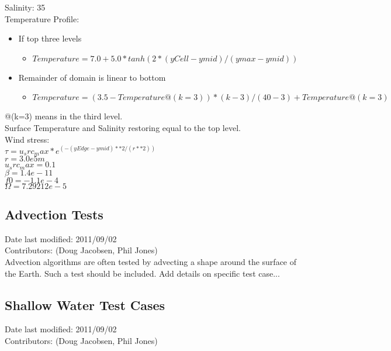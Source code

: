 \documentclass[11pt]{report}
\begin{document}
\noindent Salinity: 35 \\
\noindent Temperature Profile: 
\begin{itemize}
	\item If top three levels
		\begin{itemize}
			\item $Temperature = 7.0 + 5.0*tanh(2*(yCell - ymid) / (ymax-ymid))$
		\end{itemize}
	\item Remainder of domain is linear to bottom
		\begin{itemize}
			\item $Temperature = (3.5-Temperature@(k=3))*(k-3)/(40-3) + Temperature@(k=3)$
		\end{itemize}
\end{itemize}

\noindent @(k=3) means in the third level. \\

\noindent Surface Temperature and Salinity restoring equal to the top level. \\

\noindent Wind stress: \\
\noindent $\tau = u_src_max * e^(-(yEdge - ymid)**2/(r**2))$ \\
\noindent $r = 3.0e5m$ \\
\noindent $u_src_max = 0.1$ \\

\noindent $\beta = 1.4e-11$ \\
\noindent $f0 = -1.1e-4$ \\
\noindent $\Omega = 7.29212e-5$ \\

\subsection{Advection Tests}
Date last modified: 2011/09/02 \\
Contributors: (Doug Jacobsen, Phil Jones) \\

Advection algorithms are often tested by advecting a shape around the
surface of the Earth.  Such a test should be included. Add details
on specific test case...

\subsection{Shallow Water Test Cases}
Date last modified: 2011/09/02 \\
Contributors: (Doug Jacobsen, Phil Jones) \\
\end{document}

